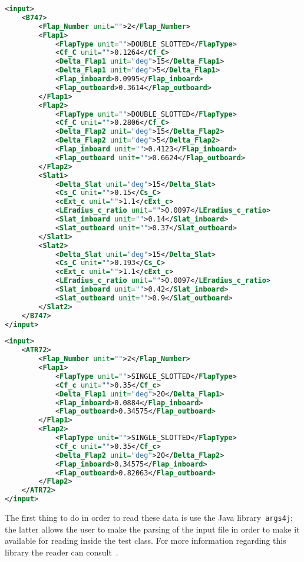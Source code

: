 \bigskip
\begin{lstlisting}[caption={Example of high-lift devices .xml input file for the B747-100B in take-off configuration}, captionpos=b, tabsize=6, language=XML]
<input>
	<B747>
		<Flap_Number unit="">2</Flap_Number>
		<Flap1>
			<FlapType unit="">DOUBLE_SLOTTED</FlapType>
			<Cf_C unit="">0.1264</Cf_C>
			<Delta_Flap1 unit="deg">15</Delta_Flap1>
			<Delta_Flap1 unit="deg">5</Delta_Flap1>
			<Flap_inboard>0.0995</Flap_inboard>
			<Flap_outboard>0.3614</Flap_outboard>
		</Flap1>
		<Flap2>
			<FlapType unit="">DOUBLE_SLOTTED</FlapType>
			<Cf_C unit="">0.2806</Cf_C>
			<Delta_Flap2 unit="deg">15</Delta_Flap2>
			<Delta_Flap2 unit="deg">5</Delta_Flap2>
			<Flap_inboard unit="">0.4123</Flap_inboard>
			<Flap_outboard unit="">0.6624</Flap_outboard>
		</Flap2>
		<Slat1>
			<Delta_Slat unit="deg">15</Delta_Slat>
			<Cs_C unit="">0.15</Cs_C>
			<cExt_c unit="">1.1</cExt_c>
			<LEradius_c_ratio unit="">0.0097</LEradius_c_ratio>
			<Slat_inboard unit="">0.14</Slat_inboard>
			<Slat_outboard unit="">0.37</Slat_outboard>
		</Slat1>
		<Slat2>
			<Delta_Slat unit="deg">15</Delta_Slat>
			<Cs_C unit="">0.193</Cs_C>
			<cExt_c unit="">1.1</cExt_c>
			<LEradius_c_ratio unit="">0.0097</LEradius_c_ratio>
			<Slat_inboard unit="">0.42</Slat_inboard>
			<Slat_outboard unit="">0.9</Slat_outboard>
		</Slat2>
	</B747>
</input>
\end{lstlisting}

\bigskip
\begin{lstlisting}[caption={Example of high-lift devices .xml input file for the ATR-72 in take-off configuration}, captionpos=b, tabsize=6, language=XML]
<input>
	<ATR72>
		<Flap_Number unit="">2</Flap_Number>
		<Flap1>
			<FlapType unit="">SINGLE_SLOTTED</FlapType>
			<Cf_c unit="">0.35</Cf_c>
			<Delta_Flap1 unit="deg">20</Delta_Flap1>
			<Flap_inboard>0.0884</Flap_inboard>
			<Flap_outboard>0.34575</Flap_outboard>
		</Flap1>
		<Flap2>
			<FlapType unit="">SINGLE_SLOTTED</FlapType>
			<Cf_c unit="">0.35</Cf_c>
			<Delta_Flap2 unit="deg">20</Delta_Flap2>
			<Flap_inboard>0.34575</Flap_inboard>
			<Flap_outboard>0.82063</Flap_outboard>
		</Flap2>
	</ATR72>
</input>
\end{lstlisting}

\bigskip
\noindent
The first thing to do in order to read these data is use the Java library~\lstinline[language=Java]!args4j!; the latter allows the user to make the \gls{parsing} of the input file in order to make it available for reading inside the test class. For more information regarding this library the reader can consult~\cite{args4j}.

